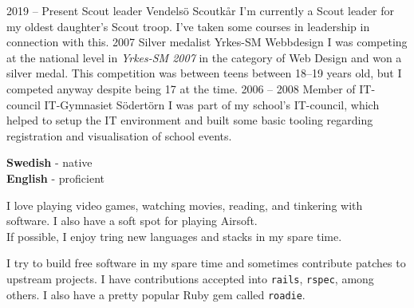 \documentclass[9pt]{developercv} %
\begin{document}

\begin{entrylist}
  \entry
    {2019 -- Present}
    {Scout leader}
    {Vendelsö Scoutkår}
    {I'm currently a Scout leader for my oldest daughter's Scout troop. I've
      taken some courses in leadership in connection with this.}
  \entry
    {2007}
    {Silver medalist}
    {Yrkes-SM Webbdesign}
    {I was competing at the national level in \textit{Yrkes-SM 2007} in the
      category of Web Design and won a silver medal. This competition was
      between teens between 18--19 years old, but I competed anyway despite
      being 17 at the time.}
  \entry
    {2006 -- 2008}
    {Member of IT-council}
    {IT-Gymnasiet Södertörn}
    {I was part of my school's IT-council, which helped to setup the IT
      environment and built some basic tooling regarding registration and
      visualisation of school events.}
\end{entrylist}


\begin{minipage}[t]{0.3\textwidth}
  \vspace{-\baselineskip} %


  \textbf{Swedish} - native\\
  \textbf{English} - proficient
\end{minipage}
\hfill
\begin{minipage}[t]{0.3\textwidth}
  \vspace{-\baselineskip} %


  I love playing video games, watching movies, reading, and tinkering with
  software. I also have a soft spot for playing Airsoft.\\ If possible, I enjoy
  tring new languages and stacks in my spare time.
\end{minipage}
\hfill
\begin{minipage}[t]{0.3\textwidth}
  \vspace{-\baselineskip} %


  I try to build free software in my spare time and sometimes contribute
  patches to upstream projects. I have contributions accepted into
  \texttt{rails}, \texttt{rspec}, among others. I also have a pretty popular
  Ruby gem called \texttt{roadie}.
\end{minipage}
\end{document}
